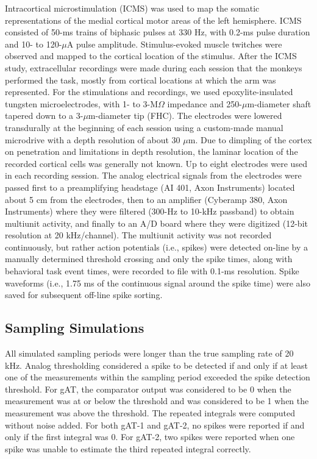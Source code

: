 \documentclass[10 pt]{article}
\begin{document}
Intracortical microstimulation (ICMS) was used to map the somatic representations of the medial cortical motor areas of the left hemisphere. ICMS consisted of 50-ms trains of biphasic pulses at 330 Hz, with 0.2-ms pulse duration and 10- to 120-$\mu$A pulse amplitude. Stimulus-evoked muscle twitches were observed and mapped to the cortical location of the stimulus. After the ICMS study, extracellular recordings were made during each session that the monkeys performed the task, mostly from cortical locations at which the arm was represented. For the stimulations and recordings, we used epoxylite-insulated tungsten microelectrodes, with 1- to 3-M$\Omega$ impedance and 250-$\mu$m-diameter shaft tapered down to a 3-$\mu$m-diameter tip (FHC). The electrodes were lowered transdurally at the beginning of each session using a custom-made manual microdrive with a depth resolution of about 30 $\mu$m. Due to dimpling of the cortex on penetration and limitations in depth resolution, the laminar location of the recorded cortical cells was generally not known. Up to eight electrodes were used in each recording session. The analog electrical signals from the electrodes were passed first to a preamplifying headstage (AI 401, Axon Instruments) located about 5 cm from the electrodes, then to an amplifier (Cyberamp 380, Axon Instruments) where they were filtered (300-Hz to 10-kHz passband) to obtain multiunit activity, and finally to an A/D board where they were digitized (12-bit resolution at 20 kHz/channel). The multiunit activity was not recorded continuously, but rather action potentials (i.e., spikes) were detected on-line by a manually determined threshold crossing and only the spike times, along with behavioral task event times, were recorded to file with 0.1-ms resolution. Spike waveforms (i.e., 1.75 ms of the continuous signal around the spike time) were also saved for subsequent off-line spike sorting.

\subsection{Sampling Simulations}

All simulated sampling periods were longer than the true sampling rate of 20 kHz.
Analog thresholding considered a spike to be detected if and only if at least one of the measurements within the sampling period exceeded the spike detection threshold.
For gAT, the comparator output was considered to be 0 when the measurement was at or below the threshold and was considered to be 1 when the measurement was above the threshold.
The repeated integrals were computed without noise added.
For both gAT-1 and gAT-2, no spikes were reported if and only if the first integral was 0.
For gAT-2, two spikes were reported when one spike was unable to estimate the third repeated integral correctly.

\nocite{*}



\end{document}
